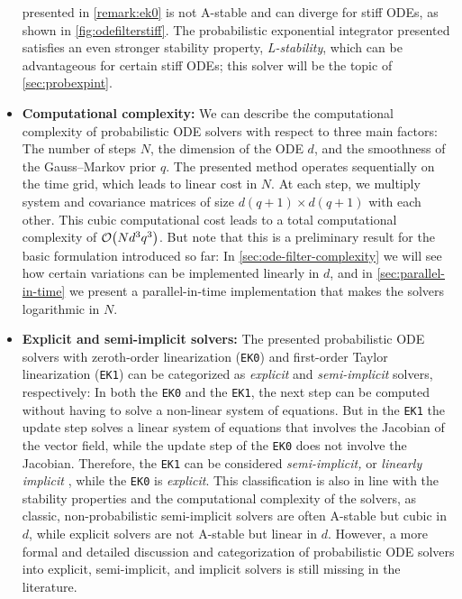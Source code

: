 \documentclass{mimosis}
\begin{document}
\begin{itemize}[left=0pt .. \parindent]
presented in \cref{remark:ek0}
is not A-stable and can diverge for stiff ODEs, as shown in \cref{fig:odefilterstiff}.
The probabilistic exponential integrator presented \probexpint{} satisfies an even stronger stability property, \emph{L-stability}, which can be advantageous for certain stiff ODEs;
this solver will be the topic of \cref{sec:probexpint}.
\item \textbf{Computational complexity:}
We can describe the computational complexity of probabilistic ODE solvers with respect to three main factors:
The number of steps \(N\),
the dimension of the ODE \(d\),
and the smoothness of the Gauss--Markov prior \(q\).
The presented method operates sequentially on the time grid, which leads to linear cost in \(N\).
At each step, we multiply system and covariance matrices of size \(d(q+1) \times d(q+1)\) with each other.
This cubic computational cost leads to a total computational complexity of
\(\order{N d^3 q^3}\).
But note that this is a preliminary result for the basic formulation introduced so far:
In \cref{sec:ode-filter-complexity} we will see how certain variations can be implemented linearly in \(d\),
and in \cref{sec:parallel-in-time} we present a parallel-in-time implementation that makes the solvers logarithmic in \(N\).
\item \textbf{Explicit and semi-implicit solvers:}
The presented probabilistic ODE solvers with zeroth-order linearization (\texttt{EK0}) and first-order Taylor linearization (\texttt{EK1}) can be categorized as \emph{explicit} and \emph{semi-implicit} solvers, respectively:
In both the \texttt{EK0} and the \texttt{EK1}, the next step can be computed without having to solve a non-linear system of equations.
But in the \texttt{EK1} the update step solves a linear system of equations that involves the Jacobian of the vector field, while the update step of the \texttt{EK0} does not involve the Jacobian.
Therefore, the \texttt{EK1} can be considered \emph{semi-implicit,} or \emph{linearly implicit} \parencite{hairer1987solving}, while the \texttt{EK0} is \emph{explicit}.
This classification is also in line with the stability properties and the computational complexity of the solvers, as classic, non-probabilistic semi-implicit solvers are often A-stable but cubic in \(d\), while explicit solvers are not A-stable but linear in \(d\).
However, a more formal and detailed discussion and categorization of probabilistic ODE solvers into explicit, semi-implicit, and implicit solvers is still missing in the literature.
\end{itemize}
\end{document}
